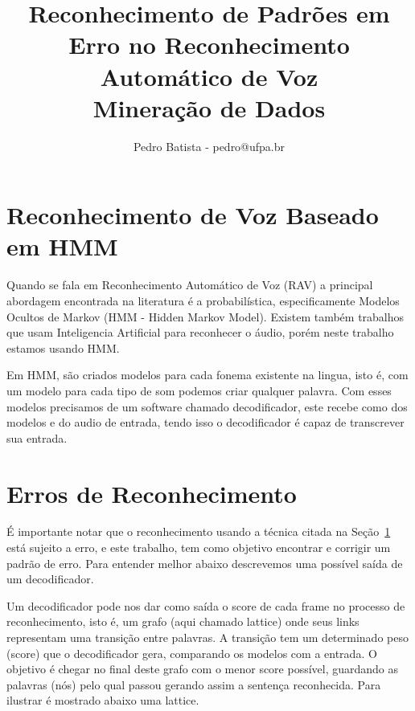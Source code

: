 \documentclass[a4paper]{article}
\title{Reconhecimento de Padrões em Erro no Reconhecimento
   Automático de Voz\\
   Mineração de Dados}
\author{Pedro Batista - pedro@ufpa.br}
\begin{document}
\maketitle

\section{Reconhecimento de Voz Baseado em HMM}\label{sec:rec}

Quando se fala em Reconhecimento Automático de Voz (RAV) a
principal abordagem encontrada na literatura é a probabilística,
especificamente Modelos Ocultos de Markov (HMM - Hidden Markov Model).
Existem também trabalhos que usam Inteligencia Artificial para
reconhecer o áudio, porém neste trabalho estamos usando HMM.

Em HMM, são criados modelos para cada fonema existente na lingua,
isto é, com um modelo para cada tipo de som podemos criar qualquer
palavra. Com esses modelos precisamos de um software chamado
decodificador, este recebe como dos modelos e do audio de entrada,
tendo isso o decodificador é capaz de transcrever sua entrada.

\section{Erros de Reconhecimento}

É importante notar que o reconhecimento usando a técnica citada
na Seção~\ref{sec:rec} está sujeito a erro, e este trabalho, tem
como objetivo encontrar e corrigir um padrão de erro. Para entender
melhor abaixo descrevemos uma possível saída de um decodificador.

Um decodificador pode nos dar como saída o score de cada frame no
processo de reconhecimento, isto é, um grafo (aqui chamado lattice) onde seus links
representam uma transição entre palavras. A transição tem um determinado
peso (score) que o decodificador gera, comparando os modelos com a entrada.
O objetivo é chegar no final deste grafo com o
menor score possível, guardando as palavras (nós) pelo qual passou
gerando assim a sentença reconhecida. Para ilustrar é mostrado abaixo
uma lattice.
\end{document}
